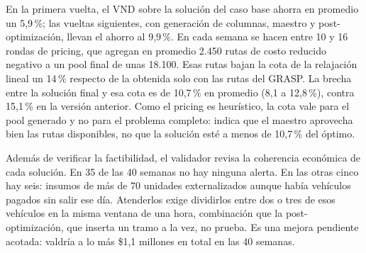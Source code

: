  En la primera vuelta, el VND sobre la solución del caso base ahorra en promedio un 5,9\,\%; las vueltas siguientes, con generación de columnas, maestro y post-optimización, llevan el ahorro al 9,9\,\%. En cada semana se hacen entre 10 y 16 rondas de pricing, que agregan en promedio 2.450 rutas de costo reducido negativo a un pool final de unas 18.100. Esas rutas bajan la cota de la relajación lineal un 14\,\% respecto de la obtenida solo con las rutas del GRASP. La brecha entre la solución final y esa cota es de 10,7\,\% en promedio (8,1 a 12,8\,\%), contra 15,1\,\% en la versión anterior. Como el pricing es heurístico, la cota vale para el pool generado y no para el problema completo: indica que el maestro aprovecha bien las rutas disponibles, no que la solución esté a menos de 10,7\,\% del óptimo.

 Además de verificar la factibilidad, el validador revisa la coherencia económica de cada solución. En 35 de las 40 semanas no hay ninguna alerta. En las otras cinco hay seis: insumos de más de 70 unidades externalizados aunque había vehículos pagados sin salir ese día. Atenderlos exige dividirlos entre dos o tres de esos vehículos en la misma ventana de una hora, combinación que la post-optimización, que inserta un tramo a la vez, no prueba. Es una mejora pendiente acotada: valdría a lo más \$1,1 millones en total en las 40 semanas.
